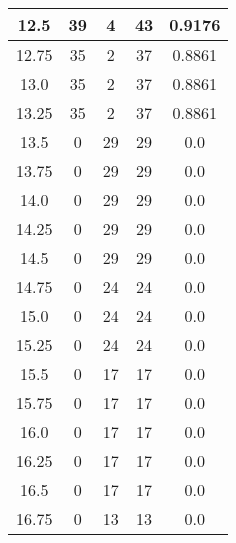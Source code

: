 \documentclass[letterpaper, 12pt]{article}
\begin{document}
\begin{longtable}{|c|c|c|c|c|}
12.5 & 39 & 4 & 43 & 0.9176 \\
\hline
12.75 & 35 & 2 & 37 & 0.8861 \\
\hline
13.0 & 35 & 2 & 37 & 0.8861 \\
\hline
13.25 & 35 & 2 & 37 & 0.8861 \\
\hline
13.5 & 0 & 29 & 29 & 0.0 \\
\hline
13.75 & 0 & 29 & 29 & 0.0 \\
\hline
14.0 & 0 & 29 & 29 & 0.0 \\
\hline
14.25 & 0 & 29 & 29 & 0.0 \\
\hline
14.5 & 0 & 29 & 29 & 0.0 \\
\hline
14.75 & 0 & 24 & 24 & 0.0 \\
\hline
15.0 & 0 & 24 & 24 & 0.0 \\
\hline
15.25 & 0 & 24 & 24 & 0.0 \\
\hline
15.5 & 0 & 17 & 17 & 0.0 \\
\hline
15.75 & 0 & 17 & 17 & 0.0 \\
\hline
16.0 & 0 & 17 & 17 & 0.0 \\
\hline
16.25 & 0 & 17 & 17 & 0.0 \\
\hline
16.5 & 0 & 17 & 17 & 0.0 \\
\hline
16.75 & 0 & 13 & 13 & 0.0 \\
\hline
\end{longtable}
\end{document}

